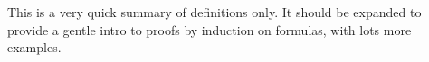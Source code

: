\documentclass[../../../include/open-logic-chapter]{subfiles}
\begin{document}

\begin{editorial}
  This is a very quick summary of definitions only. It should be
  expanded to provide a gentle intro to proofs by induction on
  formulas, with lots more examples.
\end{editorial}









\OLEndChapterHook
\end{document}
